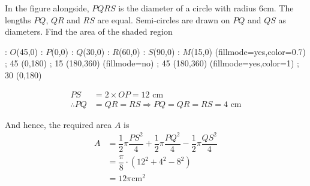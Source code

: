 

\question[3] In the figure alongside, $PQRS$ is the diameter of a circle with radius 6cm.
The lengths $PQ$, $QR$ and $RS$ are equal. Semi-circles are drawn on $PQ$ and $QS$ as diameters.
Find the area of the shaded region


\ifprintanswers
\fi 
\begin{marginfigure}

    : $O$(45,0)
    : $P$(0,0)
    : $Q$(30,0)
    : $R$(60,0)
    : $S$(90,0)
    : $M$(15,0)
  \figdrawbegin{}
    \figset (fillmode=yes,color=0.7)
     ; 45 (0,180)
     ; 15 (180,360)
    \figset (fillmode=no)
     ; 45 (180,360)
    \figset (fillmode=yes,color=1)
    \figdrawline [101,102,103,104]
     ; 30 (0,180)
  \figdrawend
  \centerline{\box\figBoxA}

\end{marginfigure}

\begin{solution}[\halfpage]
	\begin{align}
		PS &= 2\times OP = \text{12 cm} \\
		\therefore PQ &= QR = RS \Rightarrow PQ = QR = RS = \text{4 cm}
	\end{align}
	
	And hence, the required area $A$ is
	\begin{align}
		A &= \dfrac{1}{2}\pi\dfrac{PS^2}{4} + \dfrac{1}{2}\pi\dfrac{PQ^2}{4} 
		- \dfrac{1}{2}\pi\dfrac{QS^2}{4} \\
		&= \dfrac{\pi}{8}\cdot\left( 12^2 + 4^2 - 8^2\right) \\
		&= 12\pi \text{cm}^2
	\end{align}
\end{solution}

